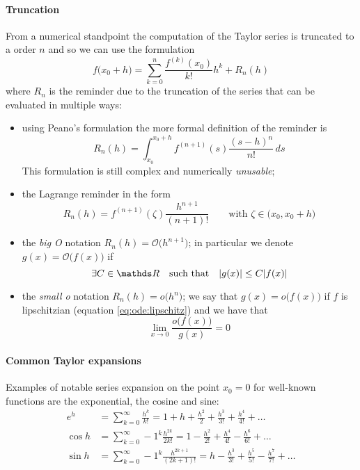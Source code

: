 	\paragraph{Truncation} From a numerical standpoint the computation of the Taylor series is truncated to a order $n$ and so we can use the formulation
	\begin{equation}
		f\big(x_0 + h\big) = \sum_{k=0}^{n} \frac{f^{(k)}(x_0)}{k!} h^k + R_n(h)
	\end{equation}
	where $R_n$ is the reminder due to the truncation of the series that can be evaluated in multiple ways:
	\begin{itemize}
		\item using Peano's formulation the more formal definition of the reminder is
		\[ R_n(h) = \int_{x_0}^{x_0+h} f^{(n+1)} (s) \frac{(s-h)^n}{n!}\, ds\]
		This formulation is still complex and numerically \textit{unusable};
		\item the Lagrange reminder in the form
		\[ R_n(h) = f^{(n+1)}(\zeta) \frac{h^{n+1}}{(n+1)!} \qquad \textrm{with } \zeta \in \big( x_0,x_0+h \big) \]
		\item the \textit{big O} notation $R_n(h) = \mathcal O\big(h^{n+1}\big)$; in particular we denote $g(x) = \mathcal O\big(f(x)\big)$ if 
		\[ \exists C \in \R \quad \textrm{such that} \quad |g(x)| \leq C|f(x)| \]
		\item the \textit{small o} notation $R_n(h) = o\big(h^n\big)$; we say that $g(x) = o\big(f(x)\big)$ if $f$ is lipschitzian (equation \ref{eq:ode:lipschitz}) and we have that
		\[ \lim_{x\rightarrow 0} \frac{o\big(f(x)\big)}{g(x)} = 0 \]
	\end{itemize}
	
	\paragraph{Common Taylor expansions}Examples of notable series expansion on the point $x_0 = 0$ for well-known functions are the exponential, the cosine and sine:
	\begin{equation}
	\begin{split}
		e^h & = \sum_{k=0}^\infty \frac{h^k}{k!} = 1 + h + \frac{h^2}{2} + \frac{h^3}{3!} + \frac{h^4}{4!} + \dots \\
		\cos h & = \sum_{k=0}^{\infty} -1^{k} \frac{h^{2k}}{2k!} = 1 - \frac{h^2}{2!} + \frac{h^4}{4!} - \frac{h^6}{6!} + \dots \\
		\sin h & = \sum_{k=0}^{\infty} -1^{k} \frac{h^{2k+1}}{(2k+1)!} = h - \frac{h^3}{3!} + \frac{h^5}{5!} - \frac{h^7}{7!} + \dots
	\end{split}
	\end{equation}
	
